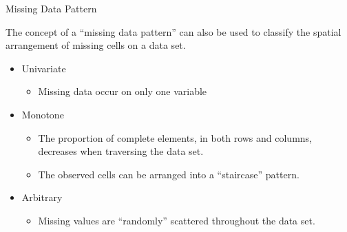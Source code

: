 \documentclass{beamer}\usepackage[]{graphicx}\usepackage[]{color}
\begin{document}

\begin{frame}{Missing Data Pattern}
  
 The concept of a ``missing data pattern'' can also be used to classify the 
  spatial arrangement of missing cells on a data set.\\
  
  \vc
  
  \begin{itemize}
  \item Univariate
    \begin{itemize}
      \item Missing data occur on only one variable
    \end{itemize}
  
    \vb
  
  \item Monotone
    \begin{itemize}
    \item The proportion of complete elements, in both rows and columns, 
      decreases when traversing the data set.
    \item The observed cells can be arranged into a ``staircase'' pattern.
    \end{itemize}
  
    \vb
  
  \item Arbitrary
    \begin{itemize}
    \item Missing values are ``randomly'' scattered throughout the data set.
    \end{itemize}
  \end{itemize}
  
\end{frame}

\watermarkoff %
\end{document}
